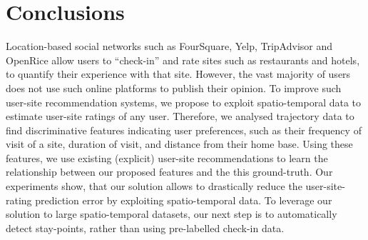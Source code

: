 \vspace{-0.0cm}
\section{Conclusions}
\label{sec:conclusion}
Location-based social networks such as FourSquare, Yelp, TripAdvisor and OpenRice allow users to ``check-in'' and rate sites such as restaurants and hotels, to quantify their experience with that site. However, the vast majority of users does not use such online platforms to publish their opinion. To improve such user-site recommendation systems, we propose to exploit spatio-temporal data to estimate user-site ratings of any user. Therefore, we analysed trajectory data to find discriminative features indicating user preferences, such as their frequency of visit of a site, duration of visit, and distance from their home base. Using these features, we use existing (explicit) user-site recommendations to learn the relationship between our proposed features and the this ground-truth. Our experiments show, that our solution allows to drastically reduce the user-site-rating prediction error by exploiting spatio-temporal data. To leverage our solution to large spatio-temporal datasets, our next step is to automatically detect stay-points, rather than using pre-labelled check-in data. 